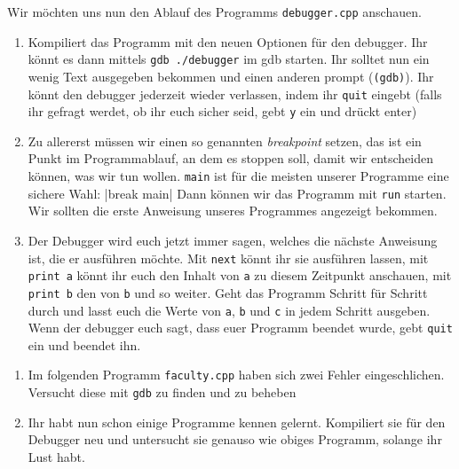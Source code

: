 \newpage

\begin{praxis}

    Wir möchten uns nun den Ablauf des Programms \texttt{debugger.cpp} anschauen.

    \begin{enumerate}
        \item Kompiliert das Programm mit den neuen Optionen für den debugger. Ihr
              könnt es dann mittels \verb|gdb ./debugger| im gdb starten. Ihr solltet
              nun ein wenig Text ausgegeben bekommen und einen anderen prompt
              (\texttt{(gdb)}). Ihr könnt den debugger jederzeit wieder verlassen,
              indem ihr \texttt{quit} eingebt (falls ihr gefragt werdet, ob ihr euch
              sicher seid, gebt \texttt{y} ein und drückt enter)
        \item Zu allererst müssen wir einen so genannten \emph{breakpoint} setzen,
              das ist ein Punkt im Programmablauf, an dem es stoppen soll, damit wir
              entscheiden können, was wir tun wollen. \texttt{main} ist für die
              meisten unserer Programme eine sichere Wahl:
              |break main|
              Dann können wir das Programm mit \texttt{run} starten. Wir sollten die
              erste Anweisung unseres Programmes angezeigt bekommen.
        \item Der Debugger wird euch jetzt immer sagen, welches die nächste
              Anweisung ist, die er ausführen möchte. Mit \texttt{next} könnt ihr sie
              ausführen lassen, mit \texttt{print a} könnt ihr euch den Inhalt von
              \texttt{a} zu diesem Zeitpunkt anschauen, mit \texttt{print b} den von
              \texttt{b} und so weiter. Geht das Programm Schritt für Schritt durch
              und lasst euch die Werte von \texttt{a}, \texttt{b} und \texttt{c} in
              jedem Schritt ausgeben. Wenn der debugger euch sagt, dass euer Programm
              beendet wurde, gebt \texttt{quit} ein und beendet ihn.
    \end{enumerate}
\end{praxis}

\begin{spiel}
    \begin{enumerate}
        \item Im folgenden Programm \texttt{faculty.cpp} haben sich zwei Fehler eingeschlichen. Versucht diese mit \texttt{gdb} zu finden und zu beheben
        
        
        \item Ihr habt nun schon einige Programme kennen gelernt. Kompiliert sie
              für den Debugger neu und untersucht sie genauso wie obiges Programm,
              solange ihr Lust habt.
    \end{enumerate}
\end{spiel}